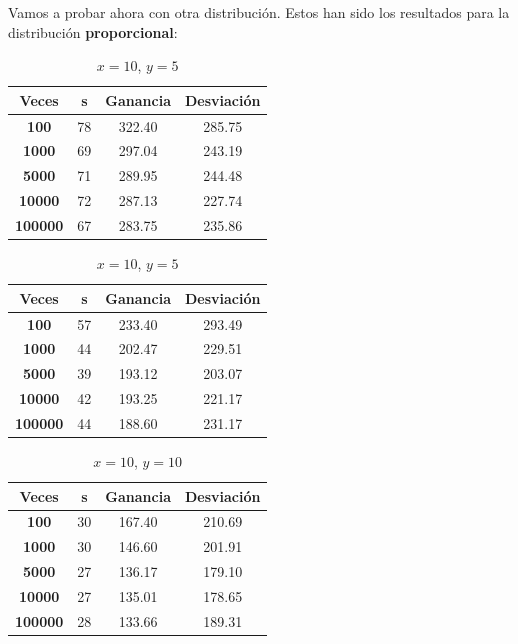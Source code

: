 \documentclass[11pt,a4paper]{report}
\begin{document}
Vamos a probar ahora con otra distribución. Estos han sido los resultados para la distribución \textbf{proporcional}:
\begin{table}[H]
	\parbox{.45\linewidth}{
	\centering
	\begin{tabular}{c|ccc}
	\textbf{Veces} & \textbf{s} & \textbf{Ganancia} & \textbf{Desviación} \\ \hline
	\textbf{100}   & 78         & 322.40            & 285.75			  \\ \hline
	\textbf{1000}  & 69         & 297.04            & 243.19			  \\ \hline
	\textbf{5000}  & 71         & 289.95            & 244.48 			  \\ \hline
	\textbf{10000} & 72         & 287.13            & 227.74			  \\ \hline
	\textbf{100000}& 67         & 283.75            & 235.86			  \\
	\end{tabular}
	\caption{$x=10$, $y=1$}
	}
	\hfill
	\parbox{.45\linewidth}{
	\centering
	\begin{tabular}{c|ccc}
	\textbf{Veces} & \textbf{s} & \textbf{Ganancia} & \textbf{Desviación} \\ \hline
	\textbf{100}   & 57         & 233.40            & 293.49			  \\ \hline
	\textbf{1000}  & 44         & 202.47            & 229.51			  \\ \hline
	\textbf{5000}  & 39         & 193.12            & 203.07 			  \\ \hline
	\textbf{10000} & 42         & 193.25            & 221.17			  \\ \hline
	\textbf{100000}& 44         & 188.60            & 231.17			  \\
	\end{tabular}
	\caption{$x=10$, $y=5$}
	}
\end{table}
\begin{table}[H]
	\centering
	\begin{tabular}{c|ccc}
	\textbf{Veces} & \textbf{s} & \textbf{Ganancia} & \textbf{Desviación} \\ \hline
	\textbf{100}   & 30         & 167.40            & 210.69			  \\ \hline
	\textbf{1000}  & 30         & 146.60            & 201.91			  \\ \hline
	\textbf{5000}  & 27         & 136.17            & 179.10 			  \\ \hline
	\textbf{10000} & 27         & 135.01            & 178.65			  \\ \hline
	\textbf{100000}& 28         & 133.66            & 189.31			  \\
	\end{tabular}
	\caption{$x=10$, $y=10$}
\end{table}
\end{document}
